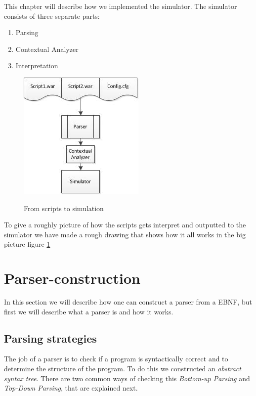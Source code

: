 This chapter will describe how we implemented the simulator. The simulator consists of three separate parts: \\
\begin{enumerate}
	\item Parsing
	\item Contextual Analyzer
	\item Interpretation
\end{enumerate}


\begin{figure}[H]
\centering
\includegraphics[scale=1.2]{rapport/6/figures/script_to_simu}
\label{fig:script_to_simu}
\caption{From scripts to simulation}
\end{figure}

To give a roughly picture of how the scripts gets interpret and outputted to the simulator we have made a rough drawing that shows how it all works in the big picture figure \ref{fig:script_to_simu}

\section{Parser-construction}
	In this section we will describe how one can construct a parser from a EBNF, but first we will describe what a parser is and how it works.
	
	\subsection{Parsing strategies}
		The job of a parser is to check if a program is syntactically correct and 
		to determine the structure of the program. To do this we constructed an {\it abstract syntax tree}.
		There are two common ways of checking this {\it Bottom-up Parsing} and {\it Top-Down Parsing}, that are explained next.
		
